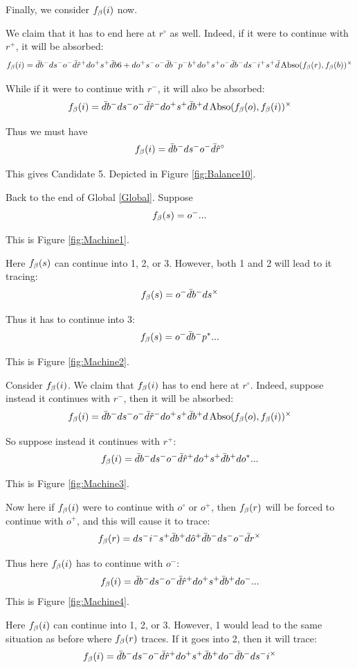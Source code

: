 Finally, we consider $f_\beta(i)$ now.

We claim that it has to end here at $r^\circ$ as well. Indeed, if it were to continue with $r^+$, it will be absorbed:
\[
f_\beta(i) = \bar{d} b^- d s^- o^- \bar{d} \hat{r}^+ d o^+ s^+ \bar{d} b6+ d o^+ s^- o^- \bar{d} b^- p^- b^+ d o^+ s^+ o^- \bar{d} b^- d s^- i^+ s^+ \bar{d} \operatorname{Abso}(f_\beta(r), f_\beta(b))^\times 
\]

While if it were to continue with $r^-$, it will also be absorbed:
\[
f_\beta(i) = \bar{d} b^- d s^- o^- \bar{d} \hat{r}^- d o^+ s^+ \bar{d} b^+ d \operatorname{Abso}(f_\beta(o), f_\beta(i))^\times
\]

Thus we must have
\[
f_\beta(i) = \bar{d} b^- d s^- o^- \bar{d} \hat{r}^\circ
\]

This gives Candidate 5. Depicted in Figure \ref{fig:Balance10}.


\label{Machine}
Back to the end of Global \ref{Global}. Suppose
\[
f_\beta(s) = o^-...
\]

This is Figure \ref{fig:Machine1}.

Here $f_\beta(s)$ can continue into 1, 2, or 3. However, both 1 and 2 will lead to it tracing:
\[
f_\beta(s) = o^- \bar{d} b^- d s^\times
\]

Thus it has to continue into 3:
\[
f_\beta(s) = o^- \bar{d} b^- p^*...
\]

This is Figure \ref{fig:Machine2}.

Consider $f_\beta(i)$. We claim that $f_\beta(i)$ has to end here at $r^\circ$. Indeed, suppose instead it continues with $r^-$, then it will be absorbed:
\[
f_\beta(i) = \bar{d} b^- d s^- o^- \bar{d} \hat{r}^- d o^+ s^+ \bar{d} b^+ d \operatorname{Abso}(f_\beta(o), f_\beta(i))^\times
\]

So suppose instead it continues with $r^+$:
\[
f_\beta(i) = \bar{d} b^- d s^- o^- \bar{d} \hat{r}^+ d o^+ s^+ \bar{d} b^+ d o^*...
\]

This is Figure \ref{fig:Machine3}.

Now here if $f_\beta(i)$ were to continue with $o^\circ$ or $o^+$, then $f_\beta(r)$ will be forced to continue with $o^+$, and this will cause it to trace:
\[
f_\beta(r) = d s^- i^- s^+ \bar{d} b^+ d \hat{o}^+ \bar{d} b^- d s^- o^- \bar{d} r^\times
\]

Thus here $f_\beta(i)$ has to continue with $o^-$:
\[
f_\beta(i) = \bar{d} b^- d s^- o^- \bar{d} \hat{r}^+ d o^+ s^+ \bar{d} b^+ d o^-...
\]
This is Figure \ref{fig:Machine4}. 

Here $f_\beta(i)$ can continue into 1, 2, or 3. However, 1 would lead to the same situation as before where $f_\beta(r)$ traces. If it goes into 2, then it will trace:
\[
f_\beta(i) = \bar{d} b^- d s^- o^- \bar{d} \hat{r}^+ d o^+ s^+ \bar{d} b^+ d o^- \bar{d} b^- d s^- i^\times
\]

